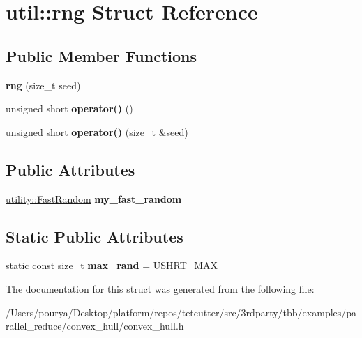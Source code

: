 \hypertarget{structutil_1_1rng}{}\section{util\+:\+:rng Struct Reference}
\label{structutil_1_1rng}
\subsection*{Public Member Functions}
\begin{DoxyCompactItemize}
\item 
\hypertarget{structutil_1_1rng_a25569fda9ffc152c7b654ba1a901e457}{}{\bfseries rng} (size\+\_\+t seed)\label{structutil_1_1rng_a25569fda9ffc152c7b654ba1a901e457}

\item 
\hypertarget{structutil_1_1rng_a9da78a5228e6f5e811d2f3858234b445}{}unsigned short {\bfseries operator()} ()\label{structutil_1_1rng_a9da78a5228e6f5e811d2f3858234b445}

\item 
\hypertarget{structutil_1_1rng_a5afe460853b19f262aa9f3e13a4d31b8}{}unsigned short {\bfseries operator()} (size\+\_\+t \&seed)\label{structutil_1_1rng_a5afe460853b19f262aa9f3e13a4d31b8}

\end{DoxyCompactItemize}
\subsection*{Public Attributes}
\begin{DoxyCompactItemize}
\item 
\hypertarget{structutil_1_1rng_a6b97789477715407774586e87982681e}{}\hyperlink{classutility_1_1FastRandom}{utility\+::\+Fast\+Random} {\bfseries my\+\_\+fast\+\_\+random}\label{structutil_1_1rng_a6b97789477715407774586e87982681e}

\end{DoxyCompactItemize}
\subsection*{Static Public Attributes}
\begin{DoxyCompactItemize}
\item 
\hypertarget{structutil_1_1rng_a1382aa72bb7dafa6b7c99ad5a3b46e01}{}static const size\+\_\+t {\bfseries max\+\_\+rand} = U\+S\+H\+R\+T\+\_\+\+M\+A\+X\label{structutil_1_1rng_a1382aa72bb7dafa6b7c99ad5a3b46e01}

\end{DoxyCompactItemize}


The documentation for this struct was generated from the following file\+:\begin{DoxyCompactItemize}
\item 
/\+Users/pourya/\+Desktop/platform/repos/tetcutter/src/3rdparty/tbb/examples/parallel\+\_\+reduce/convex\+\_\+hull/convex\+\_\+hull.\+h\end{DoxyCompactItemize}
